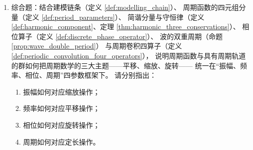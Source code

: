 \begin{enumerate}[leftmargin=3em, label=\textbf{题 \arabic*}]
    \item 综合题：结合建模链条（定义 \ref{def:modelling_chain}）、
    周期函数的四元组分量（定义 \ref{def:period_parameters}）、
    简谐分量与守恒律（定义 \ref{def:harmonic_component}、定理 \ref{thm:harmonic_three_conservations}）、
    相位算子（定义 \ref{def:discrete_phase_operator}）、
    波的双重周期（命题 \ref{prop:wave_double_period}）
    与周期卷积四算子（定义 \ref{def:periodic_convolution_four_operators}），
    说明周期函数与具有周期轨道的群如何把周期数学的三大主题——平移、缩放、旋转——
    统一在“振幅、频率、相位、周期”四参数框架下。
    请分别指出：
    \begin{enumerate}[label=(\roman*)]
        \item 振幅如何对应缩放操作；
        \item 频率如何对应平移操作；
        \item 相位如何对应旋转操作；
        \item 周期如何对应定长操作。
    \end{enumerate}
\end{enumerate}

